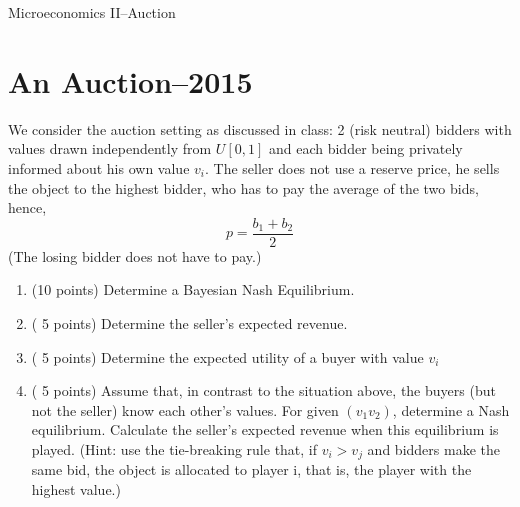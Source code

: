 \documentclass[a4paper]{article}
\begin{document}
\begin{center}
\LARGE{Microeconomics II--Auction}
\end{center}


\section*{An Auction--2015}
We consider the auction setting as discussed in class: 2 (risk neutral) bidders with values drawn independently from $U[0,1]$ and each bidder being privately informed about his own value $v_{i}$. The seller does not use a reserve price, he sells the object to the highest bidder, who has to pay the average of the two bids, hence, 
$$p = \frac{b_{1}+b_{2}}{2}$$
(The losing bidder does not have to pay.)
\begin{enumerate}
	\item (10 points) Determine a Bayesian Nash Equilibrium.
	\item   ( 5 points) Determine the seller's expected revenue.
	\item   ( 5 points) Determine the expected utility of a buyer with value $v_{i}$
	\item   ( 5 points) Assume that, in contrast to the situation above, the buyers (but not the seller) know each other's values. For given $(v_{1} v_{2})$, determine a Nash equilibrium. Calculate the seller's expected revenue when this equilibrium is played. (Hint: use the tie-breaking rule that, if $v_{i}>v_{j}$ and bidders make the same bid, the object is allocated to player i, that is, the player with the highest value.)
\end{enumerate}
\end{document}
